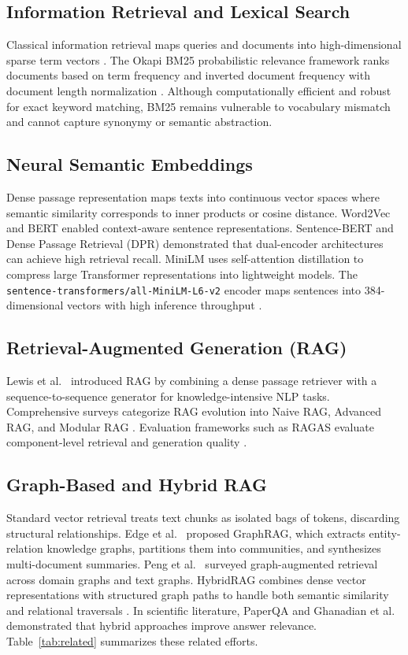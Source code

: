 \documentclass[conference]{IEEEtran}
\begin{document}
\subsection{Information Retrieval and Lexical Search}
Classical information retrieval maps queries and documents into high-dimensional sparse term vectors \cite{salton1975vsm}. The Okapi BM25 probabilistic relevance framework ranks documents based on term frequency and inverted document frequency with document length normalization \cite{robertson2009bm25}. Although computationally efficient and robust for exact keyword matching, BM25 remains vulnerable to vocabulary mismatch and cannot capture synonymy or semantic abstraction.

\subsection{Neural Semantic Embeddings}
Dense passage representation maps texts into continuous vector spaces where semantic similarity corresponds to inner products or cosine distance. Word2Vec \cite{mikolov2013word2vec} and BERT \cite{devlin2019bert} enabled context-aware sentence representations. Sentence-BERT \cite{reimers2019sbert} and Dense Passage Retrieval (DPR) \cite{karpukhin2020dpr} demonstrated that dual-encoder architectures can achieve high retrieval recall. MiniLM \cite{wang2020minilm} uses self-attention distillation to compress large Transformer representations into lightweight models. The \texttt{sentence-transformers/all-MiniLM-L6-v2} encoder maps sentences into 384-dimensional vectors with high inference throughput \cite{hf_minilm}.

\subsection{Retrieval-Augmented Generation (RAG)}
Lewis et al.\ \cite{lewis2020rag} introduced RAG by combining a dense passage retriever with a sequence-to-sequence generator for knowledge-intensive NLP tasks. Comprehensive surveys categorize RAG evolution into Naive RAG, Advanced RAG, and Modular RAG \cite{gao2023ragsurvey}. Evaluation frameworks such as RAGAS evaluate component-level retrieval and generation quality \cite{es2024ragas}.

\subsection{Graph-Based and Hybrid RAG}
Standard vector retrieval treats text chunks as isolated bags of tokens, discarding structural relationships. Edge et al.\ \cite{edge2024graphrag} proposed GraphRAG, which extracts entity-relation knowledge graphs, partitions them into communities, and synthesizes multi-document summaries. Peng et al.\ \cite{peng2024graphragsurvey} surveyed graph-augmented retrieval across domain graphs and text graphs. HybridRAG combines dense vector representations with structured graph paths to handle both semantic similarity and relational traversals \cite{sarmah2024hybridrag}. In scientific literature, PaperQA \cite{lala2023paperqa} and Ghanadian et al.\ \cite{ghanadian2026base} demonstrated that hybrid approaches improve answer relevance. Table~\ref{tab:related} summarizes these related efforts.
\end{document}
